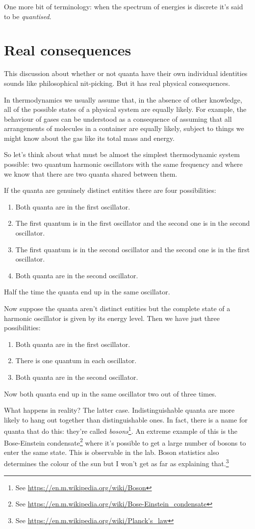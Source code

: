 \documentclass[a4paper]{article}
\begin{document}
One more bit of terminology: when the spectrum of energies is discrete it's said to be {\em quantised}.

\section{Real consequences}
This discussion about whether or not quanta have their own individual identities sounds like philosophical nit-picking.
But it has real physical consequences.

In thermodynamics we usually assume that, in the absence of other knowledge, all of the possible states of a physical system are equally likely.
For example, the behaviour of gases can be understood as a consequence of assuming that all arrangements of molecules in a container are equally likely, subject to things we might know about the gas like its total mass and energy.

So let's think about what must be almost the simplest thermodynamic system possible: two quantum harmonic oscillators with the same frequency and where we know that there are two quanta shared between them.

If the quanta are genuinely distinct entities there are four possibilities:
\begin{enumerate}
\item Both quanta are in the first oscillator.
\item The first quantum is in the first oscillator and the second one is in the second oscillator.
\item The first quantum is in the second oscillator and the second one is in the first oscillator.
\item Both quanta are in the second oscillator.
\end{enumerate}
Half the time the quanta end up in the same oscillator.

Now suppose the quanta aren't distinct entities but the complete state of a harmonic oscillator is given by its energy level.
Then we have just three possibilities:
\begin{enumerate}
\item Both quanta are in the first oscillator.
\item There is one quantum in each oscillator.
\item Both quanta are in the second oscillator.
\end{enumerate}
Now both quanta end up in the same oscillator two out of three times.

What happens in reality? The latter case.
Indistinguishable quanta are more likely to hang out together than distinguishable ones.
In fact, there is a name for quanta that do this: they're called {\em bosons}\footnote{See \url{https://en.m.wikipedia.org/wiki/Boson}}.
An extreme example of this is the Bose-Einstein condensate\footnote{See \url{https://en.m.wikipedia.org/wiki/Bose-Einstein_condensate}} where it's possible to get a large number of bosons to enter the same state.
This is observable in the lab.
Boson statistics also determines the colour of the sun but I won't get as far as explaining that.\footnote{See \url{https://en.m.wikipedia.org/wiki/Planck's_law}}
\end{document}
